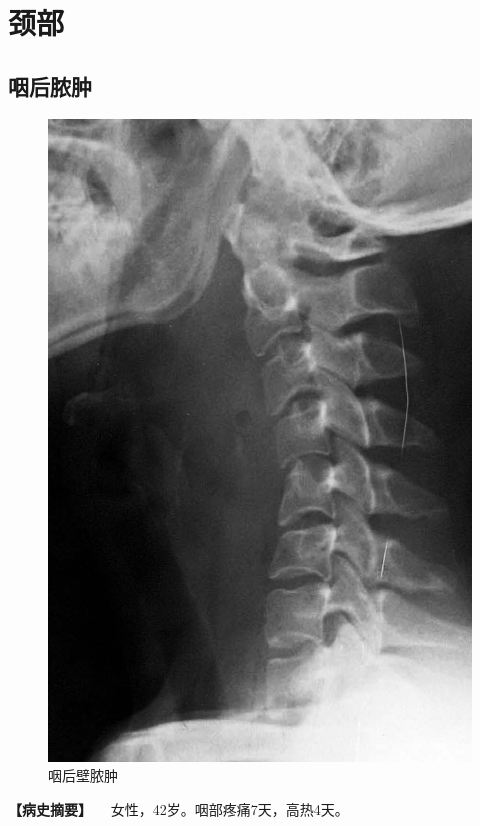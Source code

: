 \section{颈部}

\subsection{咽后脓肿}

\begin{figure}[!htbp]
 \centering
 \includegraphics{./images/Image00434.jpg}
 \captionsetup{justification=centering}
 \caption{咽后壁脓肿}
 \label{fig7-5-1}
  \end{figure} 

\textbf{【病史摘要】} 　女性，42岁。咽部疼痛7天，高热4天。

